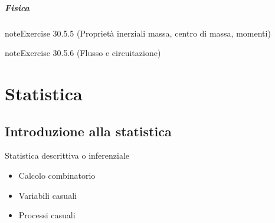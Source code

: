 \documentclass[letterpaper,10pt,italian]{jupyterBook}
\begin{document}
\subsubsection{Fisica}
\label{\detokenize{ch/vector-calculus/problems:fisica}} \label{exercise:ch/vector-calculus/problems-exercise-4}

\begin{sphinxadmonition}{note}{Exercise 30.5.5 (Proprietà inerziali \sphinxhyphen{} massa, centro di massa, momenti)}


\end{sphinxadmonition}
 \label{exercise:ch/vector-calculus/problems-exercise-5}

\begin{sphinxadmonition}{note}{Exercise 30.5.6 (Flusso e circuitazione)}


\end{sphinxadmonition}

\sphinxstepscope


\part{Statistica}

\sphinxstepscope




\chapter{Introduzione alla statistica}
\label{\detokenize{ch/statistics:introduzione-alla-statistica}}\label{\detokenize{ch/statistics:math-hs-statistics}}\label{\detokenize{ch/statistics::doc}}
\sphinxAtStartPar
{} Statistica descrittiva o inferenziale

\sphinxAtStartPar
{}
\begin{itemize}
\item {} 
\sphinxAtStartPar
Calcolo combinatorio

\item {} 
\sphinxAtStartPar
Variabili casuali

\item {} 
\sphinxAtStartPar
Processi casuali

\end{itemize}
\end{document}
